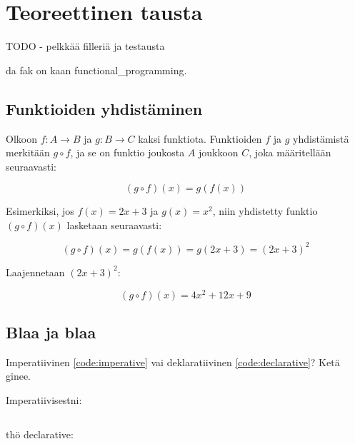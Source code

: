 \vspace{21.5pt} %
\chapter{Teoreettinen tausta}

TODO - pelkkää filleriä ja testausta

da fak on kaan \gls{functional_programming}.

\section{Funktioiden yhdistäminen}

Olkoon \( f: A \rightarrow B \) ja \( g: B \rightarrow C \) kaksi funktiota. Funktioiden \( f \) ja \( g \) yhdistämistä merkitään \( g \circ f \), ja se on funktio joukosta \( A \) joukkoon \( C \), joka määritellään seuraavasti:

\[
(g \circ f)(x) = g(f(x))
\]

Esimerkiksi, jos \( f(x) = 2x + 3 \) ja \( g(x) = x^2 \), niin yhdistetty funktio \( (g \circ f)(x) \) lasketaan seuraavasti:

\[
(g \circ f)(x) = g(f(x)) = g(2x + 3) = (2x + 3)^2
\]

Laajennetaan \( (2x + 3)^2 \):

\[
(g \circ f)(x) = 4x^2 + 12x + 9
\]

\section{Blaa ja blaa}

Imperatiivinen \ref{code:imperative} vai deklaratiivinen \ref{code:declarative}? Ketä ginee.

Imperatiivisestni: 

\begin{code} 
  \inputminted{javascript}{code/imperative.js} 
  \label{code:imperative}
\end{code}

thö declarative:

\begin{code}
  \inputminted{javascript}{code/declarative.js} 
  \label{code:declarative}
\end{code}


